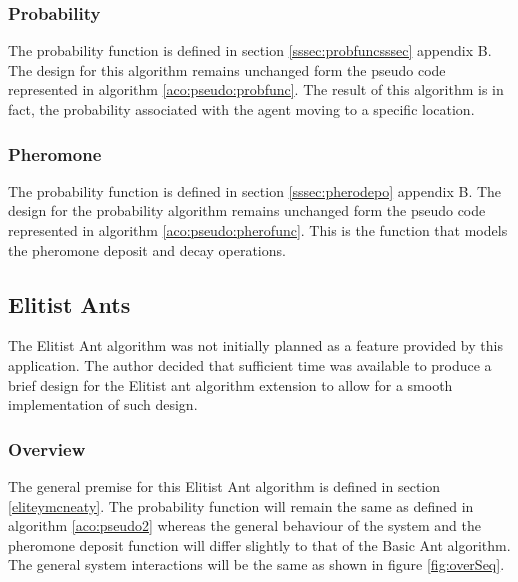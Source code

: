 \subsubsection{Probability}

The probability function is defined in section \ref{sssec:probfuncsssec} appendix B. The design for this algorithm remains unchanged form the pseudo code represented in algorithm \ref{aco:pseudo:probfunc}. The result of this algorithm is in fact, the probability associated with the agent moving to a specific location.

\subsubsection{Pheromone}

The probability function is defined in section \ref{sssec:pherodepo} appendix B. The design for the probability algorithm remains unchanged form the pseudo code represented in algorithm \ref{aco:pseudo:pherofunc}. This is the function that models the pheromone deposit and decay operations.

\subsection{Elitist Ants}

The Elitist Ant algorithm was not initially planned as a feature provided by this application. The author decided that sufficient time was available to produce a brief design for the Elitist ant algorithm extension to allow for a smooth implementation of such design.

\subsubsection{Overview}

The general premise for this Elitist Ant algorithm is defined in section \ref{eliteymcneaty}. The probability function will remain the same as defined in algorithm \ref{aco:pseudo2} whereas the general behaviour of the system and the pheromone deposit function will differ slightly to that of the Basic Ant algorithm. The general system interactions will be the same as shown in figure \ref{fig:overSeq}.


